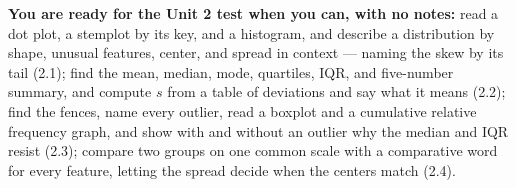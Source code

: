 \documentclass[10pt]{article}
\begin{document}
\vspace{6pt}
\boxguard[12]
\begin{remindbox}
\small
\textbf{You are ready for the Unit 2 test when you can, with no notes:}
read a dot plot, a stemplot by its key, and a histogram, and describe a distribution by shape,
unusual features, center, and spread in context --- naming the skew by its tail (2.1);
find the mean, median, mode, quartiles, IQR, and five-number summary, and compute $s$ from a
table of deviations and say what it means (2.2);
find the fences, name every outlier, read a boxplot and a cumulative relative frequency graph,
and show with and without an outlier why the median and IQR resist (2.3);
compare two groups on one common scale with a comparative word for every feature, letting the
spread decide when the centers match (2.4).
\end{remindbox}
\end{document}
